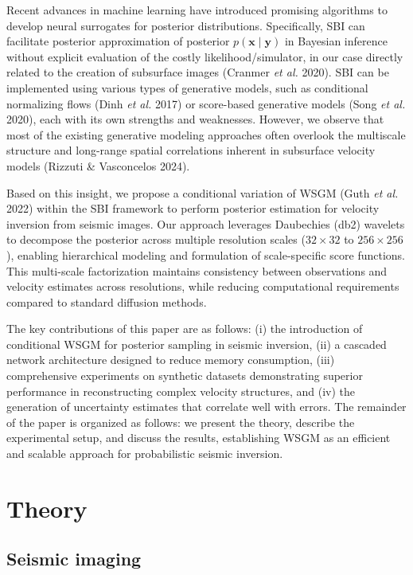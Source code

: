 \documentclass{IMAGE2025}
\begin{document}
Recent advances in machine learning have introduced promising algorithms
to develop neural surrogates for posterior distributions. Specifically,
SBI can facilitate posterior approximation of posterior
\(p(\mathbf{x} \mid \mathbf{y})\) in Bayesian inference without explicit
evaluation of the costly likelihood/simulator, in our case directly
related to the creation of subsurface images (Cranmer \emph{et al.}
2020). SBI can be implemented using various types of generative models,
such as conditional normalizing flows (Dinh \emph{et al.} 2017) or
score-based generative models (Song \emph{et al.} 2020), each with its
own strengths and weaknesses. However, we observe that most of the
existing generative modeling approaches often overlook the multiscale
structure and long-range spatial correlations inherent in subsurface
velocity models (Rizzuti \& Vasconcelos 2024).

Based on this insight, we propose a conditional variation of WSGM (Guth
\emph{et al.} 2022) within the SBI framework to perform posterior
estimation for velocity inversion from seismic images. Our approach
leverages Daubechies (db2) wavelets to decompose the posterior across
multiple resolution scales (\(32 \times 32\) to \(256 \times 256\)),
enabling hierarchical modeling and formulation of scale-specific score
functions. This multi-scale factorization maintains consistency between
observations and velocity estimates across resolutions, while reducing
computational requirements compared to standard diffusion methods.

The key contributions of this paper are as follows: (i) the introduction
of conditional WSGM for posterior sampling in seismic inversion, (ii) a
cascaded network architecture designed to reduce memory consumption,
(iii) comprehensive experiments on synthetic datasets demonstrating
superior performance in reconstructing complex velocity structures, and
(iv) the generation of uncertainty estimates that correlate well with
errors. The remainder of the paper is organized as follows: we present
the theory, describe the experimental setup, and discuss the results,
establishing WSGM as an efficient and scalable approach for
probabilistic seismic inversion.

\section{Theory}\label{theory}

\subsection{Seismic imaging}\label{seismic-imaging}
\end{document}
